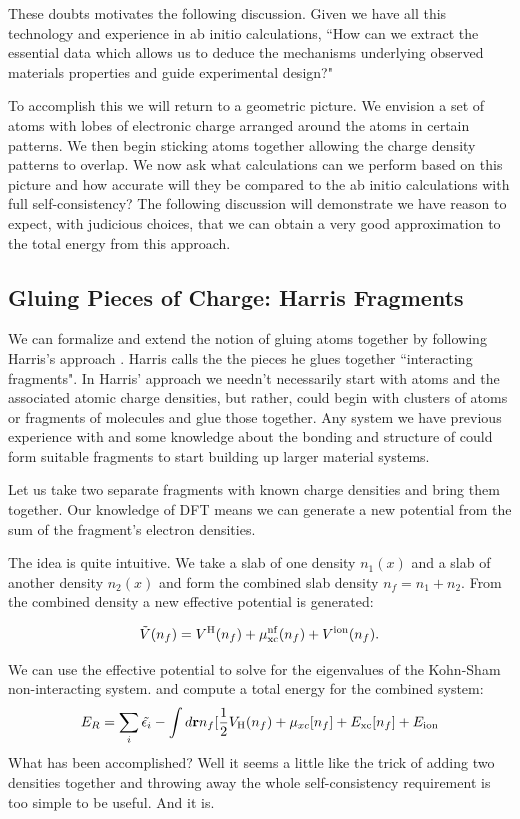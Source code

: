 These doubts motivates the following discussion. Given we have all this
technology and experience in ab initio calculations, ``How can we extract 
the essential data which allows us to deduce the mechanisms underlying
observed materials properties and guide experimental design?"

To accomplish this we will return to a geometric picture. We envision
a set of atoms with lobes of electronic charge arranged around the atoms in certain patterns.
We then begin sticking atoms together allowing the charge density patterns to overlap.
We now ask what calculations can we perform based on this picture and how accurate will
they be compared to the ab initio calculations with full self-consistency? The following
discussion will demonstrate we have reason to expect, with judicious choices, that we can obtain
a very good approximation to the total energy from this approach.

\subsection{Gluing Pieces of Charge: Harris Fragments}
We can formalize and extend the notion of gluing atoms together by following 
Harris's approach \cite{harris85}. Harris calls the the pieces he glues together 
``interacting fragments". In Harris' approach we needn't necessarily start with atoms and the associated
atomic charge densities, but rather, could begin with clusters of atoms or fragments of molecules 
and glue those together. Any system we have previous experience with and some knowledge about the bonding
and structure of could form suitable fragments to start building up larger material systems.

Let us take two separate fragments with known charge densities and bring them together. 
Our knowledge of DFT means we can generate a new potential from the sum of the 
fragment's electron densities. 

The idea is quite intuitive. We take a slab of one density $n_{1}(x)$ 
and a slab of another density $n_{2}(x)$ and form the combined slab density 
$n_{f}= n_{1} + n_{2}$. From the combined density a new effective potential
is generated:

\begin{equation}
\tilde{V}(n_{f}) = V^{\rm H}(n_{f}) + \mu^{\rm nf}_{\rm xc}(n_f) + V^{\rm ion}(n_f).
\end{equation}

We can use the effective potential to solve for the 
eigenvalues of the Kohn-Sham non-interacting system.
and compute a total energy for the combined system:
%
\begin{equation}
E_{R} = \sum_{i}\tilde{\epsilon_{i}} - \int d{\bf r} n_{f}[\frac{1}{2}V_{\rm H}(n_{f})+\mu_{xc}[n_{f}]+E_{\rm xc}[n_f]+E_{\rm ion}
\end{equation}
%
What has been accomplished? Well it seems a little like the trick of adding
two densities together and throwing away the whole self-consistency requirement 
is too simple to be useful. And it is. 

